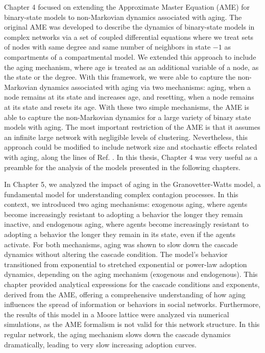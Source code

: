 Chapter 4 focused on extending the Approximate Master Equation (AME) for binary-state models to non-Markovian dynamics associated with aging. The original AME was developed to describe the dynamics of binary-state models in complex networks via a set of coupled differential equations where we treat sets of nodes with same degree and same number of neighbors in state $-1$ as compartments of a compartmental model. We extended this approach to include the aging mechanism, where age is treated as an additional variable of a node, as the state or the degree. With this framework, we were able to capture the non-Markovian dynamics associated with aging via two mechanisms: aging, when a node remains at its state and increases age, and resetting, when a node remains at its state and resets its age. With these two simple mechanisms, the AME is able to capture the non-Markovian dynamics for a large variety of binary state models with aging. The most important restriction of the AME is that it assumes an infinite large network with negligible levels of clustering. Nevertheless, this approach could be modified to include network size and stochastic effects related with aging, along the lines of Ref. \cite{peralta-2020B}. In this thesis, Chapter 4 was very useful as a preamble for the analysis of the models presented in the following chapters.

In Chapter 5, we analyzed the impact of aging in the Granovetter-Watts model, a fundamental model for understanding complex contagion processes. In this context, we introduced two aging mechanisms: exogenous aging, where agents become increasingly resistant to adopting a behavior the longer they remain inactive, and endogenous aging, where agents become increasingly resistant to adopting a behavior the longer they remain in its state, even if the agents activate. For both mechanisms, aging was shown to slow down the cascade dynamics without altering the cascade condition. The model's behavior transitioned from exponential to stretched exponential or power-law adoption dynamics, depending on the aging mechanism (exogenous and endogenous). This chapter provided analytical expressions for the cascade conditions and exponents, derived from the AME, offering a comprehensive understanding of how aging influences the spread of information or behaviors in social networks. Furthermore, the results of this model in a Moore lattice were analyzed via numerical simulations, as the AME formalism is not valid for this network structure. In this regular network, the aging mechanism slows down the cascade dynamics dramatically, leading to very slow increasing adoption curves.

